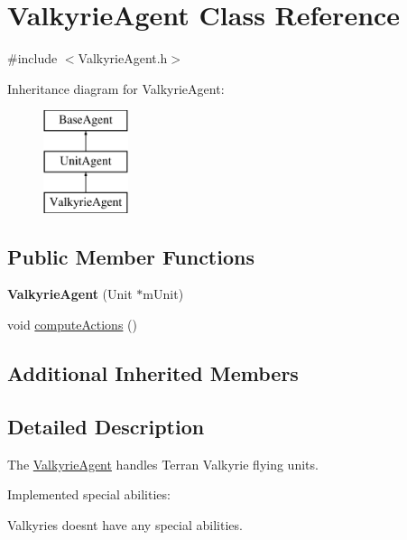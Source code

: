 \hypertarget{class_valkyrie_agent}{\section{Valkyrie\-Agent Class Reference}
\label{class_valkyrie_agent}
}


{\ttfamily \#include $<$Valkyrie\-Agent.\-h$>$}

Inheritance diagram for Valkyrie\-Agent\-:\begin{figure}[H]
\begin{center}
\leavevmode
\includegraphics[height=3.000000cm]{class_valkyrie_agent}
\end{center}
\end{figure}
\subsection*{Public Member Functions}
\begin{DoxyCompactItemize}
\item 
\hypertarget{class_valkyrie_agent_a2d562b0abf91d28a93ed665acdb4d0e9}{{\bfseries Valkyrie\-Agent} (Unit $\ast$m\-Unit)}\label{class_valkyrie_agent_a2d562b0abf91d28a93ed665acdb4d0e9}

\item 
void \hyperlink{class_valkyrie_agent_a81bd5a7f94e72c1f2f0d1f8f20fc30f2}{compute\-Actions} ()
\end{DoxyCompactItemize}
\subsection*{Additional Inherited Members}


\subsection{Detailed Description}
The \hyperlink{class_valkyrie_agent}{Valkyrie\-Agent} handles Terran Valkyrie flying units.

Implemented special abilities\-:
\begin{DoxyItemize}
\item Valkyries doesnt have any special abilities.
\end{DoxyItemize}


